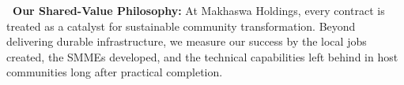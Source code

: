 \vfill

\begin{tcolorbox}[
    enhanced, colback=mhoffwhite, colframe=mhnavy, boxrule=1pt, arc=4pt,
    left=10pt, right=10pt, top=8pt, bottom=8pt,
    borderline west={3.5pt}{0pt}{mhgold}, drop shadow=black!4
]
    {\fontsize{8.8pt}{12.5pt}\selectfont\color{mhtext}
    \textbf{\color{mhnavy}\faQuoteLeft\ Our Shared-Value Philosophy:} At Makhaswa Holdings, every contract is treated as a catalyst for sustainable community transformation. Beyond delivering durable infrastructure, we measure our success by the local jobs created, the SMMEs developed, and the technical capabilities left behind in host communities long after practical completion.
    }
\end{tcolorbox}

\clearpage
